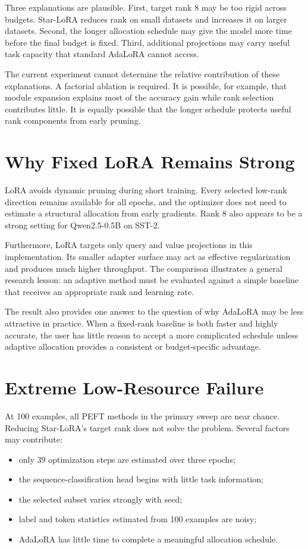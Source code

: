 Three explanations are plausible. First, target rank 8 may be too rigid across budgets. Star-LoRA
reduces rank on small datasets and increases it on larger datasets. Second, the longer allocation
schedule may give the model more time before the final budget is fixed. Third, additional
projections may carry useful task capacity that standard AdaLoRA cannot access.

The current experiment cannot determine the relative contribution of these explanations. A
factorial ablation is required. It is possible, for example, that module expansion explains most
of the accuracy gain while rank selection contributes little. It is equally possible that the
longer schedule protects useful rank components from early pruning.

\section{Why Fixed LoRA Remains Strong}

LoRA avoids dynamic pruning during short training. Every selected low-rank direction remains
available for all epochs, and the optimizer does not need to estimate a structural allocation from
early gradients. Rank 8 also appears to be a strong setting for Qwen2.5-0.5B on SST-2.

Furthermore, LoRA targets only query and value projections in this implementation. Its smaller
adapter surface may act as effective regularization and produces much higher throughput. The
comparison illustrates a general research lesson: an adaptive method must be evaluated against a
simple baseline that receives an appropriate rank and learning rate.

The result also provides one answer to the question of why AdaLoRA may be less attractive in
practice. When a fixed-rank baseline is both faster and highly accurate, the user has little reason
to accept a more complicated schedule unless adaptive allocation provides a consistent or
budget-specific advantage.

\section{Extreme Low-Resource Failure}

At 100 examples, all PEFT methods in the primary sweep are near chance. Reducing Star-LoRA's target
rank does not solve the problem. Several factors may contribute:
\begin{itemize}
  \item only 39 optimization steps are estimated over three epochs;
  \item the sequence-classification head begins with little task information;
  \item the selected subset varies strongly with seed;
  \item label and token statistics estimated from 100 examples are noisy;
  \item AdaLoRA has little time to complete a meaningful allocation schedule.
\end{itemize}


